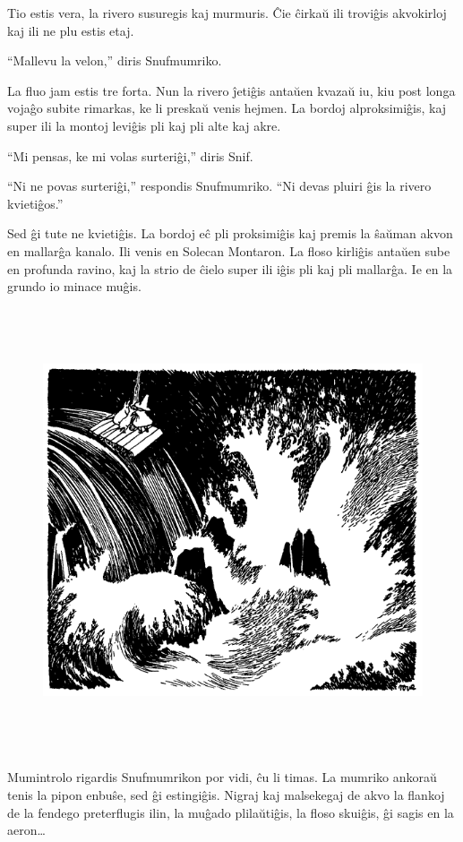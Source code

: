 Tio estis vera, la rivero susuregis kaj murmuris. Ĉie ĉirkaŭ ili troviĝis akvokirloj kaj ili ne plu estis etaj.

``Mallevu la velon,'' diris Snufmumriko.

La fluo jam estis tre forta. Nun la rivero ĵetiĝis antaŭen kvazaŭ iu, kiu post longa vojaĝo subite rimarkas, ke li preskaŭ venis hejmen. La bordoj alproksimiĝis, kaj super ili la montoj leviĝis pli kaj pli alte kaj akre.

``Mi pensas, ke mi volas surteriĝi,'' diris Snif.

``Ni ne povas surteriĝi,'' respondis Snufmumriko. ``Ni devas pluiri ĝis la rivero kvietiĝos.''

Sed ĝi tute ne kvietiĝis. La bordoj eĉ pli proksimiĝis kaj premis la ŝaŭman akvon en mallarĝa kanalo. Ili venis en Solecan Montaron. La floso kirliĝis antaŭen sube en profunda ravino, kaj la strio de ĉielo super ili iĝis pli kaj pli mallarĝa. Ie en la grundo io minace muĝis.

\begin{figure}[htbp]
\centering
\includegraphics[width=425pt,height=372pt]{3-10.png}
\caption{}
\label{3-10}
\end{figure}

Mumintrolo rigardis Snufmumrikon por vidi, ĉu li timas. La mumriko ankoraŭ tenis la pipon enbuŝe, sed ĝi estingiĝis. Nigraj kaj malsekegaj de akvo la flankoj de la fendego preterflugis ilin, la muĝado plilaŭtiĝis, la floso skuiĝis, ĝi sagis en la aeron{\ldots}

